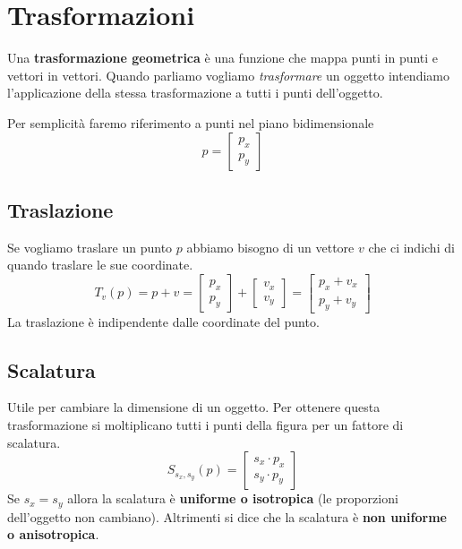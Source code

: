 \chapter{Trasformazioni}\label{trasformazioni}
Una \textbf{trasformazione geometrica} \`e una funzione che mappa punti in punti e vettori
in vettori. Quando parliamo vogliamo \emph{trasformare} un oggetto intendiamo l'applicazione
della stessa trasformazione a tutti i punti dell'oggetto.

Per semplicit\`a faremo riferimento a punti nel piano bidimensionale
\[ p = \begin{bmatrix} p_x \\ p_y \end{bmatrix} \]

\section{Traslazione}
Se vogliamo traslare un punto $p$ abbiamo bisogno di un vettore $v$ che ci indichi di quando
traslare le sue coordinate.
\[
	T_v(p) = p + v =
	\begin{bmatrix}
		p_x \\ p_y
	\end{bmatrix} +
	\begin{bmatrix}
		v_x \\ v_y
	\end{bmatrix} =
	\begin{bmatrix}
		p_x + v_x \\ p_y + v_y
	\end{bmatrix}
\]
La traslazione \`e indipendente dalle coordinate del punto.

\section{Scalatura}
Utile per cambiare la dimensione di un oggetto. Per ottenere questa trasformazione si
moltiplicano tutti i punti della figura per un fattore di scalatura.
\[
	S_{s_x, s_y}(p) =
	\begin{bmatrix}
		s_x \cdot p_x \\
		s_y \cdot p_y
	\end{bmatrix}
\]
Se $s_x = s_y$ allora la scalatura \`e \textbf{uniforme o isotropica} (le proporzioni
dell'oggetto non cambiano). Altrimenti si dice che la scalatura \`e
\textbf{non uniforme o anisotropica}.

